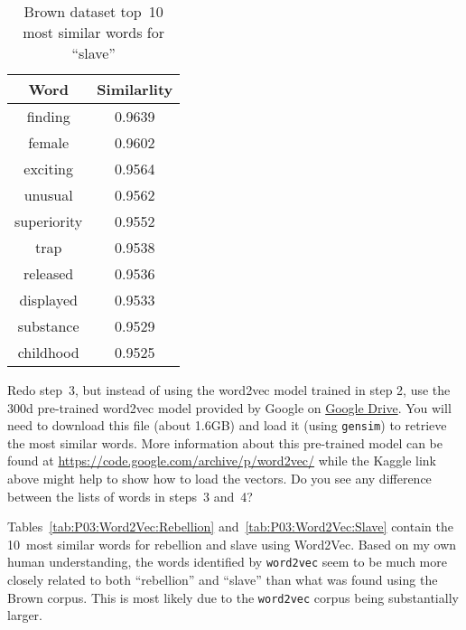 \begin{table}[h]
  \centering
  \caption{Brown dataset top~10 most similar words for ``slave''}\label{tab:P03:Brown:Slave}
  \begin{tabular}{|c|c|}
    \hline
    \textbf{Word} & \textbf{Similarlity} \\\hline\hline
    finding       & 0.9639 \\\hline
    female        & 0.9602 \\\hline
    exciting      & 0.9564 \\\hline
    unusual       & 0.9562 \\\hline
    superiority   & 0.9552 \\\hline
    trap          & 0.9538 \\\hline
    released      & 0.9536 \\\hline
    displayed     & 0.9533 \\\hline
    substance     & 0.9529 \\\hline
    childhood     & 0.9525 \\\hline
  \end{tabular}
\end{table}

\begin{subproblem}
  Redo step~3, but instead of using the word2vec model trained in step 2, use the 300d pre-trained word2vec model provided by Google on \href{https://drive.google.com/file/d/0B7XkCwpI5KDYNlNUTTlSS21pQmM/edit}{Google Drive}. You will need to download this file (about 1.6GB) and load it (using \texttt{gensim}) to retrieve the most similar words. More information about this pre-trained model can be found at \url{https://code.google.com/archive/p/word2vec/} while the Kaggle link above might help to show how to load the vectors. Do you see any difference between the lists of words in steps~3 and~4?
\end{subproblem}

Tables~\ref{tab:P03:Word2Vec:Rebellion} and~\ref{tab:P03:Word2Vec:Slave} contain the 10~most similar words for rebellion and slave using Word2Vec.  Based on my own human understanding, the words identified by \texttt{word2vec} seem to be much more closely related to both ``rebellion'' and ``slave'' than what was found using the Brown corpus.  This is most likely due to the \texttt{word2vec} corpus being substantially larger.


